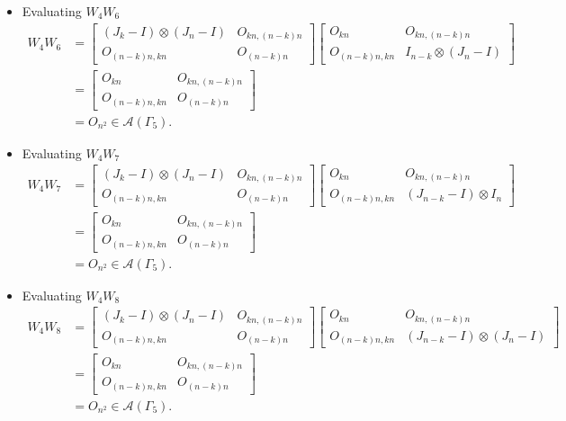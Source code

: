 \begin{itemize}
\item Evaluating $W_{4}W_{6}$
\begin{align*}
    W_4W_6 &=
    \begin{bmatrix}
        (J_k - I) \otimes (J_n - I) & O_{kn, (n-k)n} \\
        O_{(n-k)n,kn} & O_{(n-k)n}
    \end{bmatrix}
    \begin{bmatrix}
        O_{kn} & O_{kn, (n-k)n} \\
        O_{(n-k)n,kn} & I_{n-k} \otimes (J_n-I)   
    \end{bmatrix}\\
    &= \begin{bmatrix}
        O_{kn} & O_{kn, (n-k)n} \\
        O_{(n-k)n,kn} & O_{(n - k)n} 
    \end{bmatrix}\\
    &= O_{n^2}\in\mathcal{A}(\Gamma_5).
\end{align*}

\item Evaluating $W_{4}W_{7}$
\begin{align*}
    W_4W_7 &=
    \begin{bmatrix}
        (J_k - I) \otimes (J_n - I) & O_{kn, (n-k)n} \\
        O_{(n-k)n,kn} & O_{(n-k)n}
    \end{bmatrix}
    \begin{bmatrix}
        O_{kn} & O_{kn, (n-k)n} \\
        O_{(n-k)n,kn} & (J_{n-k}-I) \otimes I_n  
    \end{bmatrix}\\
    &= \begin{bmatrix}
        O_{kn} & O_{kn, (n-k)n} \\
        O_{(n-k)n,kn} & O_{(n - k)n} 
    \end{bmatrix}\\
    &= O_{n^2}\in\mathcal{A}(\Gamma_5).
\end{align*}

\item Evaluating $W_{4}W_{8}$
\begin{align*}
    W_4W_8 &=
    \begin{bmatrix}
        (J_k - I) \otimes (J_n - I) & O_{kn, (n-k)n} \\
        O_{(n-k)n,kn} & O_{(n-k)n}
    \end{bmatrix}
    \begin{bmatrix}
        O_{kn} & O_{kn, (n-k)n} \\
        O_{(n-k)n,kn} & (J_{n-k}-I) \otimes (J_n-I)  
    \end{bmatrix}\\
    &= \begin{bmatrix}
        O_{kn} & O_{kn, (n-k)n} \\
        O_{(n-k)n,kn} & O_{(n - k)n} 
    \end{bmatrix}\\
    &= O_{n^2}\in\mathcal{A}(\Gamma_5).
\end{align*}


\end{itemize}

